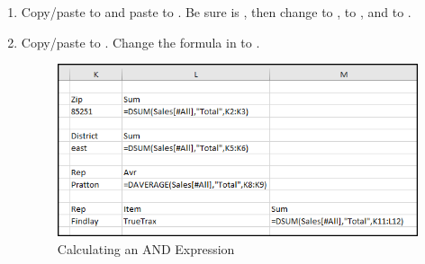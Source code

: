 \begin{enumbox}
	\begin{enumerate}
		\item Copy/paste  to  and paste  to . Be sure  is , then change  to ,  to , and  to .
		\item Copy/paste  to . Change the formula in  to . 
		
		\begin{figure}[H]
			\centering
			\includegraphics[width=\maxwidth{.95\linewidth}]{gfx/ch09_fig22}
			\caption{Calculating an AND Expression}
			\label{09:fig22}
		\end{figure}
		

\end{enumerate}
\end{enumbox}
